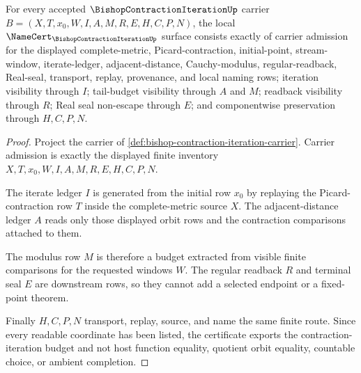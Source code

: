 \begin{theorem}\label{thm:bishop-contraction-iteration-namecert-obligations}
For every accepted $\BishopContractionIterationUp$ carrier $B=(X,T,x_0,W,I,A,M,R,E,H,C,P,N)$, the local $\NameCert_{\BishopContractionIterationUp}$ surface consists exactly of carrier admission for the displayed complete-metric, Picard-contraction, initial-point, stream-window, iterate-ledger, adjacent-distance, Cauchy-modulus, regular-readback, Real-seal, transport, replay, provenance, and local naming rows; iteration visibility through $I$; tail-budget visibility through $A$ and $M$; readback visibility through $R$; Real seal non-escape through $E$; and componentwise preservation through $H,C,P,N$.
\end{theorem}
\begin{proof}
Project the carrier of \autoref{def:bishop-contraction-iteration-carrier}. Carrier admission is exactly the displayed finite inventory $X,T,x_0,W,I,A,M,R,E,H,C,P,N$.

The iterate ledger $I$ is generated from the initial row $x_0$ by replaying the Picard-contraction row $T$ inside the complete-metric source $X$. The adjacent-distance ledger $A$ reads only those displayed orbit rows and the contraction comparisons attached to them.

The modulus row $M$ is therefore a budget extracted from visible finite comparisons for the requested windows $W$. The regular readback $R$ and terminal seal $E$ are downstream rows, so they cannot add a selected endpoint or a fixed-point theorem.

Finally $H,C,P,N$ transport, replay, source, and name the same finite route. Since every readable coordinate has been listed, the certificate exports the contraction-iteration budget and not host function equality, quotient orbit equality, countable choice, or ambient completion.
\end{proof}

